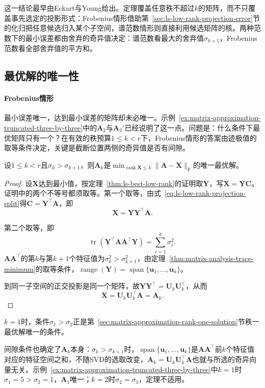 这一结论最早由Eckart与Young给出。定理覆盖任意秩不超过$k$的矩阵，而不只覆盖事先选定的投影形式：Frobenius情形借助第~\ref{sec:ls-low-rank-projection-error}节的化归把任意候选归入某个子空间，谱范数情形则直接利用候选矩阵的核。两种范数下的最小误差都由舍弃的奇异值决定：谱范数看最大的舍弃值$\sigma_{k+1}$，Frobenius范数看全部舍弃值的平方和。

\subsection{最优解的唯一性}
\label{sec:matrix-approximation-low-rank-uniqueness}

\paragraph{Frobenius情形}
最小误差唯一，达到最小误差的矩阵却未必唯一。示例~\ref{ex:matrix-approximation-truncated-three-by-three}中的$\bm A_2$与$\bm A_2'$已经说明了这一点。问题是：什么条件下最优矩阵只有一个？在有效的秩预算$1\leq k<r$下，Frobenius情形的答案由迹极值的取等条件决定，关键是截断位置两侧的奇异值是否有间隙。

\begin{theorem}[Frobenius最佳逼近的唯一性]
\label{thm:ls-best-low-rank-uniqueness}
设$1\leq k<r$且$\sigma_k>\sigma_{k+1}$，则$\bm A_k$是$\min_{\operatorname{rank}\bm X\leq k}\lVert\bm A-\bm X\rVert_{\mathrm F}$的唯一最优解。
\end{theorem}
\begin{proof}
设$\bm X$达到最小值，按定理~\ref{thm:ls-best-low-rank}的证明取$\bm Y$，写$\bm X=\bm Y\bm C$。证明中的两个不等号都须取等。第一个取等，由式~\eqref{eq:ls-low-rank-projection-split}得$\bm C=\bm Y^\top\bm A$，即
\[
 \bm X=\bm Y\bm Y^\top\bm A .
\]

第二个取等，即
\[
 \operatorname{tr}(\bm Y^\top\bm A\bm A^\top\bm Y)=\sum_{i=1}^k\sigma_i^2 .
\]
$\bm A\bm A^\top$的第$k$与第$k+1$个特征值为$\sigma_k^2>\sigma_{k+1}^2$，由定理~\ref{thm:matrix-analysis-trace-minimum}的取等条件，$\operatorname{range}(\bm Y)=\operatorname{span}\{\bm u_1,\ldots,\bm u_k\}$。

到同一子空间的正交投影是同一个矩阵，故$\bm Y\bm Y^\top=\bm U_k\bm U_k^\top$，从而
\[
 \bm X=\bm U_k\bm U_k^\top\bm A=\bm A_k .
\]
\end{proof}

$k=1$时，条件$\sigma_1>\sigma_2$正是第~\ref{sec:matrix-approximation-rank-one-solution}节秩一最优解唯一的条件。

间隙条件也确定了$\bm A_k$本身：$\sigma_k>\sigma_{k+1}$时，$\operatorname{span}\{\bm u_1,\ldots,\bm u_k\}$是$\bm A\bm A^\top$前$k$个特征值对应的特征空间之和，不随SVD的选取改变，$\bm A_k=\bm U_k\bm U_k^\top\bm A$也就与所选的奇异向量无关。示例~\ref{ex:matrix-approximation-truncated-three-by-three}中$k=1$时$\sigma_1=5>\sigma_2=1$，$\bm A_1$唯一；$k=2$时$\sigma_2=\sigma_3$，定理不适用。

